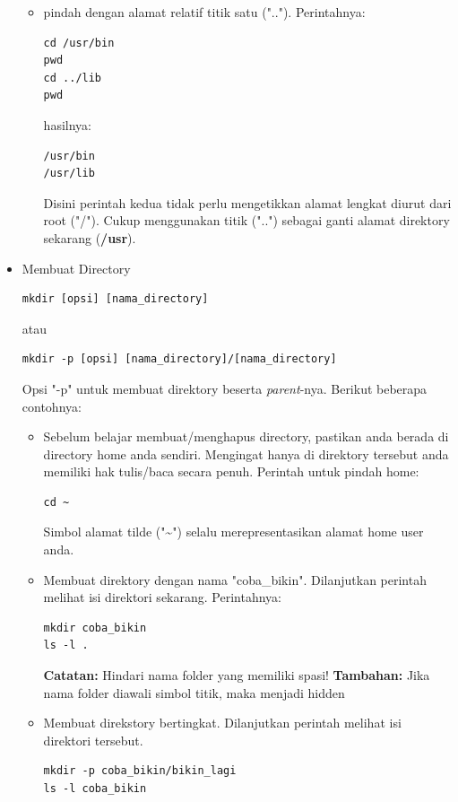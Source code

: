 \documentclass[12pt,]{article}
\begin{document}
\begin{itemize}
\begin{itemize}
			\item pindah dengan alamat relatif titik satu ("..").
			Perintahnya:
			\begin{verbatim}
cd /usr/bin
pwd
cd ../lib
pwd
			\end{verbatim}
			hasilnya:
			\begin{verbatim}
/usr/bin
/usr/lib
			\end{verbatim}
			Disini perintah kedua tidak perlu mengetikkan alamat lengkat diurut dari root ("/").
			Cukup menggunakan titik ("..") sebagai ganti alamat direktory sekarang (\textbf{/usr}).

		\end{itemize}

		\item Membuat Directory
		\begin{verbatim}
mkdir [opsi] [nama_directory]
		\end{verbatim}
		atau
		\begin{verbatim}
mkdir -p [opsi] [nama_directory]/[nama_directory]
		\end{verbatim}
		Opsi "-p" untuk membuat direktory beserta \textit{parent}-nya.
		Berikut beberapa contohnya:
		\begin{itemize}
			\item Sebelum belajar membuat/menghapus directory, pastikan anda berada di directory home anda sendiri.
			Mengingat hanya di direktory tersebut anda memiliki hak tulis/baca secara penuh.
			Perintah untuk pindah home:
			\begin{verbatim}
cd ~
			\end{verbatim}
			Simbol alamat tilde ("\textasciitilde") selalu merepresentasikan alamat home user anda.

			\item Membuat direktory dengan nama "coba\_bikin".
			Dilanjutkan perintah melihat isi direktori sekarang.
			Perintahnya:
			\begin{verbatim}
mkdir coba_bikin
ls -l .
			\end{verbatim}
			\textbf{Catatan:} Hindari nama folder yang memiliki spasi!
			\textbf{Tambahan:} Jika nama folder diawali simbol titik, maka menjadi hidden

			\item Membuat direkstory bertingkat.
			Dilanjutkan perintah melihat isi direktori tersebut.
			\begin{verbatim}
mkdir -p coba_bikin/bikin_lagi
ls -l coba_bikin
			\end{verbatim}


\end{itemize}
\end{itemize}
\end{document}
